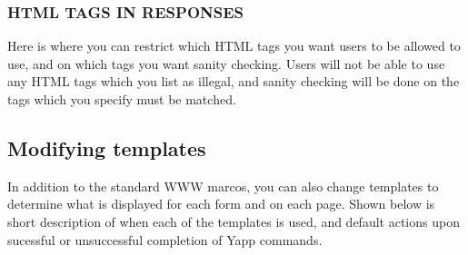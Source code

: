 \documentclass[twoside]{report}
\begin{document}
      \subsubsection*{HTML TAGS IN RESPONSES}
         Here is where you can restrict which HTML tags you want users to be
         allowed to use, and on which tags you want sanity checking. Users will
         not be able to use any HTML tags which you list as illegal, and 
         sanity checking will be done on the tags which you specify must be 
         matched.

      \subsection{Modifying templates}
      \label{s:template}
      In addition to the standard WWW marcos, you can also change
      templates to determine  what is displayed for each form and
      on each page.  Shown below is short description of when each 
      of the  templates is used, and default actions upon sucessful or
      unsuccessful completion of Yapp commands.
      \vspace{12pt}
      \par
      \tablelasttail{\hline}
\end{document}
